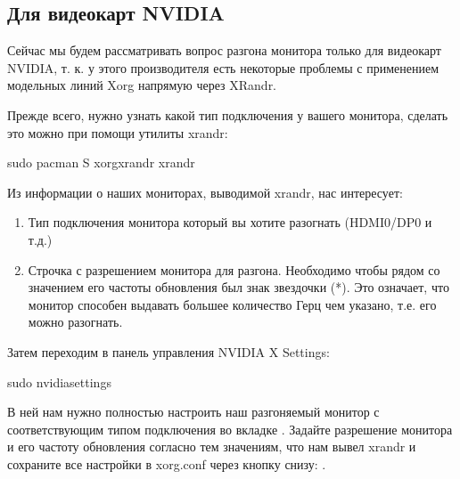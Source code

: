 \documentclass[letterpaper,10pt,russian,openany]{sphinxmanual}
\begin{document}
\ignorespaces 

\subsection{Для видеокарт NVIDIA}
\label{\detokenize{source/first-steps:monitor-overlocking-nvidia}}\label{\detokenize{source/first-steps:index-15}}\label{\detokenize{source/first-steps:id15}}
\sphinxAtStartPar
Сейчас мы будем рассматривать вопрос разгона монитора только для видеокарт NVIDIA,
т. к. у этого производителя есть некоторые проблемы с применением модельных линий Xorg напрямую через XRandr.

\sphinxAtStartPar
Прежде всего, нужно узнать какой тип подключения у вашего монитора, сделать это можно при помощи утилиты xrandr:

\begin{sphinxVerbatim}[commandchars=\\\{\}]
sudo pacman \PYGZhy{}S xorg\PYGZhy{}xrandr 
xrandr                     
\end{sphinxVerbatim}

\sphinxAtStartPar
Из информации о наших мониторах, выводимой xrandr, нас интересует:
\begin{enumerate}
%
\item {} 
\sphinxAtStartPar
Тип подключения монитора который вы хотите разогнать (HDMI\sphinxhyphen{}0/DP\sphinxhyphen{}0 и т.д.)

\item {} 
\sphinxAtStartPar
Строчка с разрешением монитора для разгона.
Необходимо чтобы рядом со значением его частоты обновления был знак звездочки (*).
Это означает, что монитор способен выдавать большее количество Герц чем указано, т.е. его можно разогнать.

\end{enumerate}

\sphinxAtStartPar
Затем переходим в панель управления NVIDIA X Settings:

\begin{sphinxVerbatim}[commandchars=\\\{\}]
sudo nvidia\PYGZhy{}settings
\end{sphinxVerbatim}

\sphinxAtStartPar
В ней нам нужно полностью настроить наш разгоняемый монитор с соответствующим типом подключения во вкладке  .
Задайте разрешение монитора и его частоту обновления согласно тем значениям,
что нам вывел xrandr и сохраните все настройки в xorg.conf через кнопку снизу: .
\end{document}
